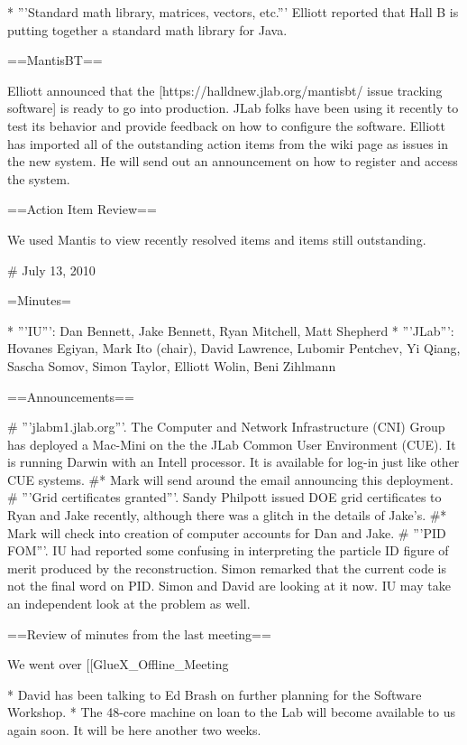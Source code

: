 * '''Standard math library, matrices, vectors, etc.''' Elliott reported that Hall B is putting together a standard math library for Java.

==MantisBT==

Elliott announced that the [https://halldnew.jlab.org/mantisbt/ issue tracking software] is ready to go into production. JLab folks have been using it recently to test its behavior and provide feedback on how to configure the software. Elliott has imported all of the outstanding action items from the wiki page as issues in the new system. He will send out an announcement on how to register and access the system.

==Action Item Review==

We used Mantis to view recently resolved items and items still outstanding.


# July 13, 2010

=Minutes=

* '''IU''': Dan Bennett, Jake Bennett, Ryan Mitchell, Matt Shepherd
* '''JLab''': Hovanes Egiyan, Mark Ito (chair), David Lawrence, Lubomir Pentchev, Yi Qiang, Sascha Somov, Simon Taylor, Elliott Wolin, Beni Zihlmann

==Announcements==

# '''jlabm1.jlab.org'''. The Computer and Network Infrastructure (CNI) Group has deployed a Mac-Mini on the the JLab Common User Environment (CUE). It is running Darwin with an Intell processor. It is available for log-in just like other CUE systems.
#* Mark will send around the email announcing this deployment.
# '''Grid certificates granted'''. Sandy Philpott issued DOE grid certificates to Ryan and Jake recently, although there was a glitch in the details of Jake's.
#* Mark will check into creation of computer accounts for Dan and Jake.
# '''PID FOM'''. IU had reported some confusing in interpreting the particle ID figure of merit produced by the reconstruction. Simon remarked that the current code is not the final word on PID. Simon and David are looking at it now. IU may take an independent look at the problem as well.

==Review of minutes from the last meeting==

We went over [[GlueX_Offline_Meeting%

* David has been talking to Ed Brash on further planning for the Software Workshop.
* The 48-core machine on loan to the Lab will become available to us again soon. It will be here another two weeks.

